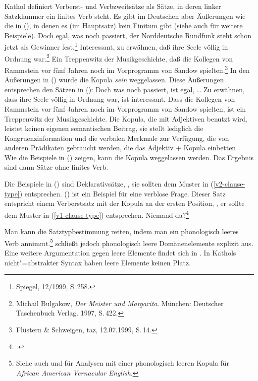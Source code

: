 Kathol definiert Verberst- und Verbzweitsätze als Sätze, in deren linker Satzklammer
ein finites Verb steht. Es gibt im Deutschen aber Äußerungen wie die in (),
in denen es (im Hauptsatz) kein Finitum gibt (siehe auch  für weitere
Beispiele).
\eal
\ex Doch egal,      was  noch  passiert, der Norddeutsche Rundfunk             steht  schon   jetzt als Gewinner fest.\footnote{
        Spiegel, 12/1999, S.\,258.
}
\ex Interessant, zu erwähnen, daß ihre Seele völlig    in Ordnung war.\footnote{
        Michail Bulgakow, \emph{Der Meister und Margarita}. München: Deutscher Taschenbuch Verlag. 1997, S.\,422.
      }
\ex Ein Treppenwitz der    Musikgeschichte, daß die Kollegen   von Rammstein vor    fünf Jahren noch im      Vorprogramm   von Sandow spielten.\footnote{
        Flüstern \& Schweigen, taz, 12.07.1999, S.\,14. %
}
\zl
In den Äußerungen in () wurde die Kopula \emph{sein} weggelassen.
Diese Äußerungen entsprechen den Sätzen in ():
\eal
\ex Doch was noch passiert, ist egal, \ldots
\ex Zu erwähnen, dass ihre Seele völlig in Ordnung war, ist interessant.
\ex Dass die Kollegen von Rammstein vor fünf Jahren noch im Vorprogramm von Sandow spielten, ist ein Treppenwitz der Musikgeschichte.
\zl
Die Kopula, die mit Adjektiven benutzt wird, leistet keinen eigenen semantischen Beitrag,
sie stellt lediglich die Kongruenzinformation und die verbalen Merkmale zur Verfügung, die von anderen Prädikaten
gebraucht werden, die das Adjektiv + Kopula einbetten \citep[]{Paul1919a}.
Wie die Beispiele in () zeigen, kann die Kopula weggelassen werden. Das Ergebnis sind dann
Sätze ohne finites Verb.

Die Beispiele in () sind Deklarativsätze, \dash, sie sollten dem Muster in
(\ref{v2-clause-type}) entsprechen. () ist ein Beispiel für eine verblose Frage.
Dieser Satz entspricht einem Verberstsatz mit der Kopula an der ersten Position,
\dash, er sollte dem Muster in (\ref{v1-clause-type}) entsprechen.
\ea
Niemand da?\footnote{
        .
}
\z

\noindent
Man kann die Satztypbestimmung retten, indem man ein phonologisch leeres Verb annimmt.\footnote{
  Siehe auch  und  für Analysen
  mit einer phonologisch leeren Kopula für \emph{African American Vernacular English}.%
}
 schließt jedoch phonologisch leere Domänenelemente explizit aus.
Eine weitere Argumentation gegen leere Elemente findet sich in .
In Kathols nicht"=abstrakter Syntax haben leere Elemente keinen Platz.
\largerpage[2]

